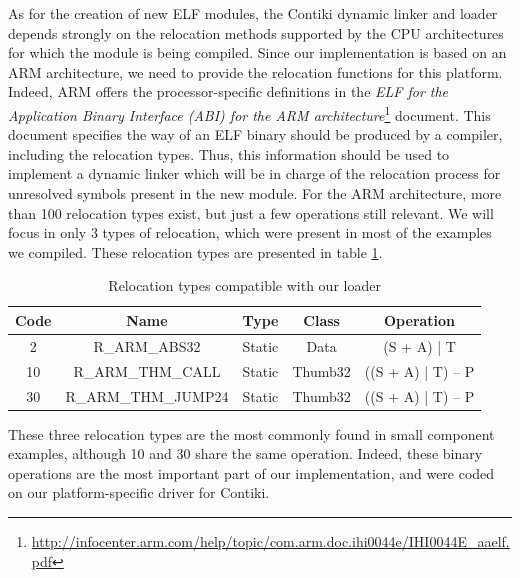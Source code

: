 As for the creation of new ELF modules, the Contiki dynamic linker and loader \cite{dunkels06runtime} depends strongly on the relocation methods supported by the CPU architectures for which the module is being compiled.
Since our implementation is based on an ARM architecture, we need to provide the relocation functions for this platform.
Indeed, ARM offers the processor-specific definitions in the \textit{ELF for the Application Binary Interface (ABI) for the ARM architecture}\footnote{\url{http://infocenter.arm.com/help/topic/com.arm.doc.ihi0044e/IHI0044E_aaelf.pdf}} document.
This document specifies the way of an ELF binary should be produced by a compiler, including the relocation types.
Thus, this information should be used to implement a dynamic linker which will be in charge of the relocation process for unresolved symbols present in the new module.
For the ARM architecture, more than 100 relocation types exist, but just a few operations still relevant.
We will focus in only 3 types of relocation, which were present in most of the examples we compiled.
These relocation types are presented in table \ref{tab:relocTypes}.

\begin{table}[htb]
	\centering
	\caption{Relocation types compatible with our loader}
	\label{tab:relocTypes}
	\begin{tabular}{|c|c|c|c|c|}
		\hline
		\textbf{Code} & \textbf{Name}       & \textbf{Type} & \textbf{Class} & \textbf{Operation} \\ \hline
		2             & R\_ARM\_ABS32       & Static        & Data           & (S + A) | T        \\ \hline
		10            & R\_ARM\_THM\_CALL   & Static        & Thumb32        & ((S + A) | T) – P  \\ \hline
		30            & R\_ARM\_THM\_JUMP24 & Static        & Thumb32        & ((S + A) | T) – P  \\ \hline
	\end{tabular}
\end{table}

These three relocation types are the most commonly found in small component examples, although 10 and 30 share the same operation.
Indeed, these binary operations are the most important part of our implementation, and were coded on our platform-specific driver for Contiki.


